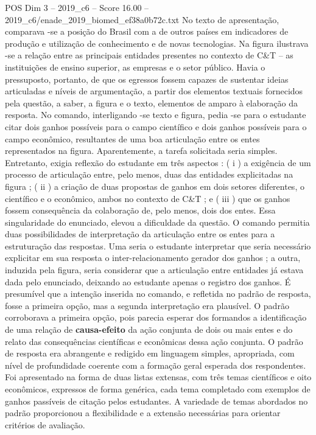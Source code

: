 \begin{textsample}{POS Dim 3 – 2019\_c6 – Score 16.00 – 2019\_c6/enade\_2019\_biomed\_ef38a0b72c.txt}
No texto de apresentação, comparava -se a posição do Brasil com a de outros países em indicadores de produção e utilização de conhecimento e de novas tecnologias.
Na figura ilustrava -se a relação entre as principais entidades presentes no contexto de C\&T – as instituições de ensino superior, as empresas e o setor público.
Havia o pressuposto, portanto, de que os egressos fossem capazes de sustentar ideias articuladas e níveis de argumentação, a partir dos elementos textuais fornecidos pela questão, a saber, a figura e o texto, elementos de amparo à elaboração da resposta.
No comando, interligando -se texto e figura, pedia -se para o estudante citar dois ganhos possíveis para o campo científico e dois ganhos possíveis para o campo econômico, resultantes de uma boa articulação entre os entes representados na figura.
Aparentemente, a tarefa solicitada seria simples.
Entretanto, exigia reflexão do estudante em três aspectos : ( i ) a exigência de um processo de articulação entre, pelo menos, duas das entidades explicitadas na figura ; ( ii ) a criação de duas propostas de ganhos em dois setores diferentes, o científico e o econômico, ambos no contexto de C\&T ; e ( iii ) que os ganhos fossem consequência da colaboração de, pelo menos, dois dos entes.
Essa singularidade do enunciado, elevou a dificuldade da questão.
O comando permitia duas possibilidades de interpretação da articulação entre os entes para a estruturação das respostas.
Uma seria o estudante interpretar que seria necessário explicitar em sua resposta o inter-relacionamento gerador dos ganhos ; a outra, induzida pela figura, seria considerar que a articulação entre entidades já estava dada pelo enunciado, deixando ao estudante apenas o registro dos ganhos.
É presumível que a intenção inserida no comando, e refletida no padrão de resposta, fosse a primeira opção, mas a segunda interpretação era plausível.
O padrão corroborava a primeira opção, pois parecia esperar dos formandos a identificação de uma relação de \textbf{causa-efeito} da ação conjunta de dois ou mais entes e do relato das consequências científicas e econômicas dessa ação conjunta.
O padrão de resposta era abrangente e redigido em linguagem simples, apropriada, com nível de profundidade coerente com a formação geral esperada dos respondentes.
Foi apresentado na forma de duas listas extensas, com três temas científicos e oito econômicos, expressos de forma genérica, cada tema completado com exemplos de ganhos passíveis de citação pelos estudantes.
A variedade de temas abordados no padrão proporcionou a flexibilidade e a extensão necessárias para orientar critérios de avaliação.

\end{textsample}
